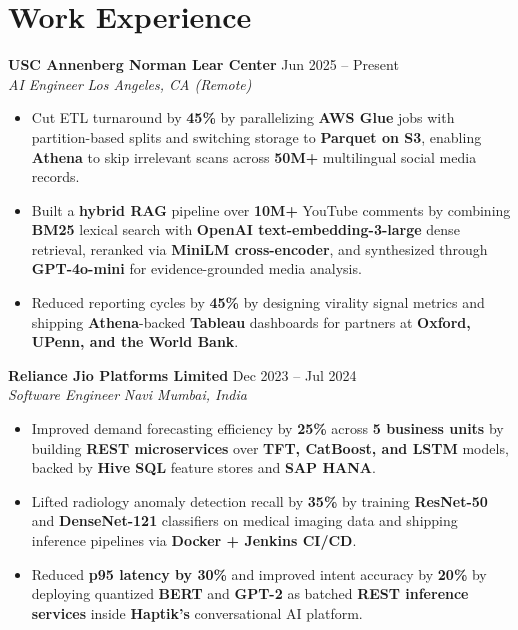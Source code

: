 \documentclass[letterpaper,10pt]{article}
\newcommand{\resumeSubheading}[4]{%
  \vspace{2pt}%
  \textbf{#1} \hfill {#2} \\[-1pt]
  \textit{#3} \hfill \textit{#4}%
  \vspace{1pt}%
}
\begin{document}
\section{Work Experience}

\resumeSubheading
  {USC Annenberg Norman Lear Center}{Jun 2025 -- Present}
  {AI Engineer}{Los Angeles, CA (Remote)}
\begin{itemize}
  \item Cut ETL turnaround by \textbf{45\%} by parallelizing \textbf{AWS Glue} jobs with partition-based splits and switching storage to \textbf{Parquet on S3}, enabling \textbf{Athena} to skip irrelevant scans across \textbf{50M+} multilingual social media records.
  \item Built a \textbf{hybrid RAG} pipeline over \textbf{10M+} YouTube comments by combining \textbf{BM25} lexical search with \textbf{OpenAI text-embedding-3-large} dense retrieval, reranked via \textbf{MiniLM cross-encoder}, and synthesized through \textbf{GPT-4o-mini} for evidence-grounded media analysis.
  \item Reduced reporting cycles by \textbf{45\%} by designing virality signal metrics and shipping \textbf{Athena}-backed \textbf{Tableau} dashboards for partners at \textbf{Oxford, UPenn, and the World Bank}.
\end{itemize}

\vspace{2pt}

\resumeSubheading
  {Reliance Jio Platforms Limited}{Dec 2023 -- Jul 2024}
  {Software Engineer}{Navi Mumbai, India}
\begin{itemize}
  \item Improved demand forecasting efficiency by \textbf{25\%} across \textbf{5 business units} by building \textbf{REST microservices} over \textbf{TFT, CatBoost, and LSTM} models, backed by \textbf{Hive SQL} feature stores and \textbf{SAP HANA}.
  \item Lifted radiology anomaly detection recall by \textbf{35\%} by training \textbf{ResNet-50} and \textbf{DenseNet-121} classifiers on medical imaging data and shipping inference pipelines via \textbf{Docker + Jenkins CI/CD}.
  \item Reduced \textbf{p95 latency by 30\%} and improved intent accuracy by \textbf{20\%} by deploying quantized \textbf{BERT} and \textbf{GPT-2} as batched \textbf{REST inference services} inside \textbf{Haptik's} conversational AI platform.
\end{itemize}
\end{document}
